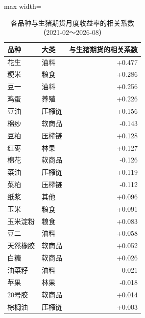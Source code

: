 \begin{table}[htbp]
\centering
\small
\caption{各品种与生猪期货月度收益率的相关系数（2021-02～2026-08）}
\label{tab:corr-hog}
\begin{adjustbox}{max width=\textwidth}
\begin{tabular}{@{}llr@{}}
\toprule
品种 & 大类 & 与生猪期货的相关系数 \\
\midrule
花生 & 油料 & +0.477 \\
粳米 & 粮食 & +0.286 \\
豆一 & 油料 & +0.256 \\
鸡蛋 & 养殖 & +0.226 \\
豆油 & 压榨链 & +0.156 \\
棉纱 & 软商品 & -0.143 \\
豆粕 & 压榨链 & +0.128 \\
红枣 & 林果 & +0.127 \\
棉花 & 软商品 & -0.126 \\
菜油 & 压榨链 & +0.119 \\
菜粕 & 压榨链 & -0.112 \\
纸浆 & 其他 & +0.096 \\
玉米 & 粮食 & +0.091 \\
玉米淀粉 & 粮食 & +0.083 \\
豆二 & 油料 & +0.058 \\
天然橡胶 & 软商品 & +0.052 \\
白糖 & 软商品 & +0.026 \\
油菜籽 & 油料 & -0.021 \\
苹果 & 林果 & -0.018 \\
20号胶 & 软商品 & +0.014 \\
棕榈油 & 压榨链 & +0.003 \\
\bottomrule
\end{tabular}
\end{adjustbox}
\end{table}
